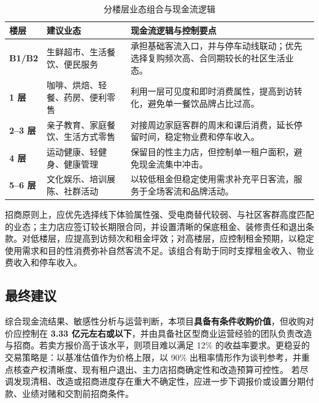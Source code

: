 \documentclass[11pt,a4paper]{ctexart}
\begin{document}
\begin{table}[H]
  \centering
  \caption{分楼层业态组合与现金流逻辑}
  \scriptsize
  \renewcommand{\arraystretch}{1.0}
  \begin{tabularx}{\textwidth}{>{\bfseries}p{1.55cm} p{3.1cm} X}
    \toprule
    楼层 & 建议业态 & 现金流逻辑与控制要点 \\
    \midrule
    B1/B2 & 生鲜超市、生活餐饮、便民服务 & 承担基础客流入口，并与停车动线联动；优先选择复购频次高、合同期较长的社区生活业态。 \\
    1 层 & 咖啡、烘焙、轻餐、药房、便利零售 & 利用一层可见度和即时消费属性，提高到访转化，避免单一餐饮品牌占比过高。 \\
    2--3 层 & 亲子教育、家庭餐饮、生活方式零售 & 对接周边家庭客群的周末和课后消费，延长停留时间，稳定物业费和停车收入。 \\
    4 层 & 运动健康、轻健身、健康管理 & 保留目的性主力店，但控制单一租户面积，避免现金流集中冲击。 \\
    5--6 层 & 文化娱乐、培训展陈、社群活动 & 以较低租金但稳定使用需求补充平日客流，服务于全场客流和品牌活动。 \\
    \bottomrule
  \end{tabularx}
\end{table}

招商原则上，应优先选择线下体验属性强、受电商替代较弱、与社区客群高度匹配的业态；主力店应签订较长期限合同，并设置清晰的保底租金、装修责任和退出条款。对低楼层，应提高到访频次和租金坪效；对高楼层，应控制租金预期，以稳定使用需求和目的性消费弥补自然客流不足。该组合有助于同时支撑租金收入、物业费收入和停车收入。

\subsection{最终建议}

\begin{tcolorbox}[
  enhanced,
  colback=softblue,
  colframe=linegray,
  boxrule=0.4pt,
  arc=1.6mm,
  left=2.2mm,right=2.2mm,top=1.5mm,bottom=1.5mm
]
综合现金流结果、敏感性分析与运营判断，本项目\textbf{具备有条件收购价值}，但收购对价应控制在 \textbf{3.33 亿元左右或以下}，并由具备社区型商业运营经验的团队负责改造与招商。若卖方报价高于该水平，则项目难以满足 12\% 的收益率要求。更稳妥的交易策略是：以基准估值作为价格上限，以 90\% 出租率情形作为谈判参考，并重点核查产权清晰度、现有租户退出、主力店招商确定性和改造预算可控性。
若尽调发现清租、改造或招商进度存在重大不确定性，应进一步下调报价或设置分期付款、业绩对赌和交割前招商条件。
\end{tcolorbox}
\end{document}
